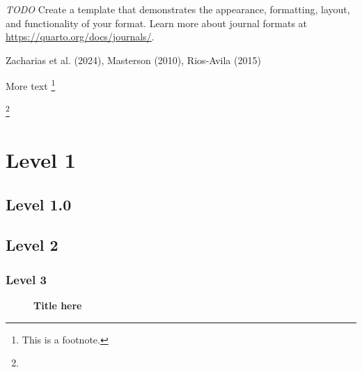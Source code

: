 \documentclass[
  12pt,
]{article}
\begin{document}
\emph{TODO} Create a template that demonstrates the appearance,
formatting, layout, and functionality of your format. Learn more about
journal formats at \url{https://quarto.org/docs/journals/}.

Zacharias et al. (2024), Masterson (2010), Rios‐Avila (2015)

\lipsum[1-2]

More text \footnote{This is a footnote.}

\lipsum[1] \footnote{\lipsum[1]}

\section{Level 1}\label{level-1}

\subsection{Level 1.0}\label{level-1.0}

\lipsum[1-2]

\subsection{Level 2}\label{level-2}

\lipsum[1-2]

\subsubsection{Level 3}\label{level-3}

\begin{table}[H]

\caption{\label{tbl-one}\textbf{Title here}}


\end{table}%

\lipsum[1-2]

\begin{figure}

\caption{\label{fig-one}\textbf{Title here}}


\end{figure}%
\end{document}
